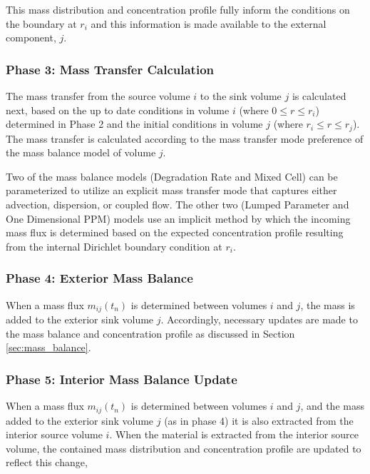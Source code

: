 This mass distribution and concentration profile fully inform 
the conditions on the boundary at $r_i$ and this information is made available 
to the external component, $j$.


\subsubsection{Phase 3: Mass Transfer Calculation}

The mass transfer from the source volume $i$ to the sink volume $j$ is 
calculated next, based on the up to date conditions in volume $i$ (where $0\le r \le r_i$) 
determined in Phase 2 and the initial conditions in volume $j$ (where $r_i \le 
r \le r_j$). The mass transfer is calculated according to the mass transfer mode 
preference of the mass balance model of volume $j$.  

Two of the mass balance models (Degradation Rate and Mixed Cell) can be 
parameterized to utilize an explicit mass transfer mode that captures either 
advection, dispersion, or coupled flow.  The other two (Lumped Parameter and 
One Dimensional PPM) models use an implicit method by which the incoming mass 
flux is determined based on the expected concentration profile resulting from 
the internal Dirichlet boundary condition at $r_i$. 

\subsubsection{Phase 4: Exterior Mass Balance}

When a mass flux $m_{ij}(t_n)$ is determined between volumes $i$ and $j$, the 
mass is added to the exterior sink volume $j$. Accordingly, necessary updates 
are made to the mass balance and concentration profile as discussed in Section 
\ref{sec:mass_balance}.

\subsubsection{Phase 5: Interior Mass Balance Update}

When a mass flux $m_{ij}(t_n)$ is determined between volumes $i$ and $j$, and 
the mass added to the exterior sink volume $j$ (as in phase 4) it is also 
extracted from the interior source volume $i$.  When the material is extracted 
from the interior source volume, the contained mass distribution and 
concentration profile are updated to reflect this change,

